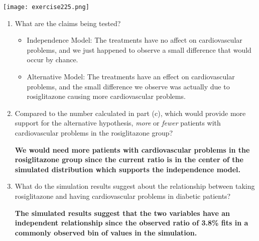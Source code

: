 \documentclass[10pt,letterpaper,unboxed,cm]{exam}
\begin{document}
\begin{questions}
\begin{parts}
        \texttt{[image: exercise225.png]}
        
        \begin{enumerate}[label=\roman*.]
            \item What are the claims being tested?
                    
            \bigskip
            {\bf
                \begin{itemize}
                    \item Independence Model: The treatments have no affect on cardiovascular problems, and we just happened to observe a small difference that would occur by chance.
                    \item Alternative Model: The treatments have an effect on cardiovascular problems, and the small difference we observe was actually due to rosiglitazone causing more cardiovascular problems.
                \end{itemize}
            } 
            \bigskip

            \item Compared to the number calculated in part (c), which would provide more support for the alternative hypothesis, {\it more} or {\it fewer} patients with cardiovascular problems in the rosiglitazone group?
        
            \bigskip
            {\bf We would need more patients with cardiovascular problems in the rosiglitazone group since the current ratio is in the center of the simulated distribution which supports the independence model.} 
            \bigskip

            \item What do the simulation results suggest about the relationship between taking rosiglitazone and having cardiovascular problems in diabetic patients?
        
            \bigskip
            {\bf The simulated results suggest that the two variables have an independent relationship since the observed ratio of 3.8\% fits in a commonly observed bin of values in the simulation.} 
            \bigskip
        \end{enumerate}

	\end{parts}



\end{questions}
\end{document}
